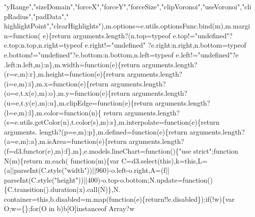 \begin{DoxyCode}
{{      "yRange"},\textcolor{stringliteral}{"sizeDomain"},\textcolor{stringliteral}{"forceX"},\textcolor{stringliteral}{"forceY"},\textcolor{stringliteral}{"forceSize"},\textcolor{stringliteral}{"clipVoronoi"},\textcolor{stringliteral}{"useVoronoi"},\textcolor{stringliteral}{"clipRadius"},\textcolor{stringliteral}{"padData"},\textcolor{stringliteral}{"
      highlightPoint"},\textcolor{stringliteral}{"clearHighlights"}),m.options=e.utils.optionsFunc.bind(m),m.margin=\textcolor{keyword}{function}(
      e)\{\textcolor{keywordflow}{return} arguments.length?(n.top=typeof e.top!=\textcolor{stringliteral}{"undefined"}?e.top:n.top,n.right=typeof e.right!=\textcolor{stringliteral}{"undefined"}
      ?e.right:n.right,n.bottom=typeof e.bottom!=\textcolor{stringliteral}{"undefined"}?e.bottom:n.bottom,n.left=typeof e.left!=\textcolor{stringliteral}{"undefined"}?e
      .left:n.left,m):n\},m.width=\textcolor{keyword}{function}(e)\{\textcolor{keywordflow}{return} arguments.length?(r=e,m):r\},m.height=\textcolor{keyword}{function}(e)\{\textcolor{keywordflow}{return} 
      arguments.length?(i=e,m):i\},m.x=\textcolor{keyword}{function}(e)\{\textcolor{keywordflow}{return} arguments.length?(o=e,t.x(e),m):o\},m.y=\textcolor{keyword}{function}(e)\{\textcolor{keywordflow}{return} 
      arguments.length?(u=e,t.y(e),m):u\},m.clipEdge=\textcolor{keyword}{function}(e)\{\textcolor{keywordflow}{return} arguments.length?(l=e,m):l\},m.color=\textcolor{keyword}{function}(n)\{\textcolor{keywordflow}{
      return} arguments.length?(s=e.utils.getColor(n),t.color(s),m):s\},m.interpolate=\textcolor{keyword}{function}(e)\{\textcolor{keywordflow}{return} arguments.
      length?(p=e,m):p\},m.defined=\textcolor{keyword}{function}(e)\{\textcolor{keywordflow}{return} arguments.length?(a=e,m):a\},m.isArea=\textcolor{keyword}{function}(e)\{\textcolor{keywordflow}{return} 
      arguments.length?(f=d3.functor(e),m):f\},m\},e.models.lineChart=\textcolor{keyword}{function}()\{\textcolor{stringliteral}{"use strict"};\textcolor{keyword}{function} N(m)\{\textcolor{keywordflow}{return} m.each(\textcolor{keyword}{
      function}(m)\{var C=d3.select(\textcolor{keyword}{this}),k=\textcolor{keyword}{this},L=(a||parseInt(C.style(\textcolor{stringliteral}{"width"}))||960)-o.left-o.right,A=(f||
      parseInt(C.style(\textcolor{stringliteral}{"height"}))||400)-o.top-o.bottom;N.update=\textcolor{keyword}{function}()\{C.transition().duration(x).call(N)\},N.
      container=\textcolor{keyword}{this},b.disabled=m.map(\textcolor{keyword}{function}(e)\{\textcolor{keywordflow}{return}!!e.disabled\});\textcolor{keywordflow}{if}(!w)\{var O;w=\{\};\textcolor{keywordflow}{for}(O in b)b[O]instanceof Array?w
}
\end{DoxyCode}
